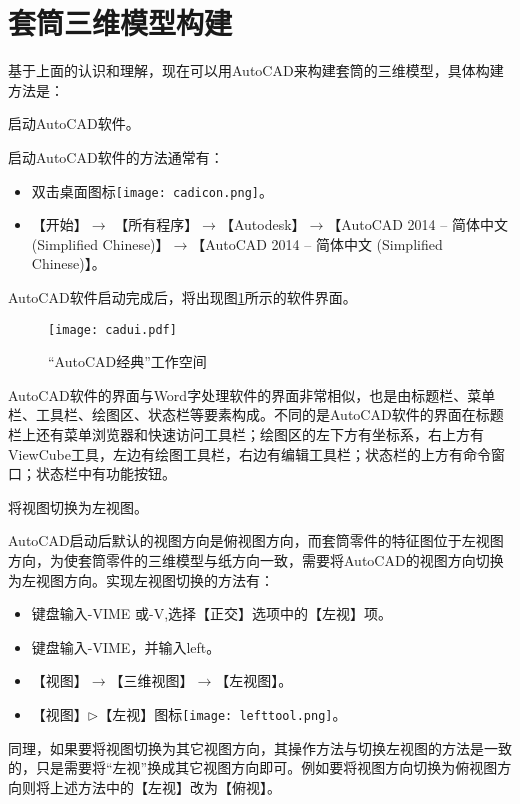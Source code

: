 \section{套筒三维模型构建}\label{sec:taotongjianmo}
基于上面的认识和理解，现在可以用AutoCAD来构建套筒的三维模型，具体构建方法是：
\begin{procedure}

\item 启动AutoCAD软件。

启动AutoCAD软件的方法通常有：
\begin{itemize}
\item 双击桌面图标\texttt{[image: cadicon.png]}。
\item 【开始】$\rightarrow$ 【所有程序】$\rightarrow$【Autodesk】$\rightarrow$【AutoCAD 2014 – 简体中文 (Simplified Chinese)】$\rightarrow$【AutoCAD 2014 – 简体中文 (Simplified Chinese)】。
\end{itemize}

AutoCAD软件启动完成后，将出现图\ref{fig:cadui}所示的软件界面。
\begin{figure}[htbp]
\centering
\texttt{[image: cadui.pdf]}
\caption{“AutoCAD经典”工作空间}\label{fig:cadui}
\end{figure}

AutoCAD软件的界面与Word字处理软件的界面非常相似，也是由标题栏、菜单栏、工具栏、绘图区、状态栏等要素构成。不同的是AutoCAD软件的界面在标题栏上还有菜单浏览器和快速访问工具栏；绘图区的左下方有坐标系，右上方有ViewCube工具，左边有绘图工具栏，右边有编辑工具栏；状态栏的上方有命令窗口；状态栏中有功能按钮。

\item 将视图切换为左视图。

AutoCAD启动后默认的视图方向是俯视图方向，而套筒零件的特征图位于左视图方向，为使套筒零件的三维模型与纸方向一致，需要将AutoCAD的视图方向切换为左视图方向。实现左视图切换的方法有：
\begin{itemize}
\item 键盘输入-VIME 或-V,选择【正交】选项中的【左视】项。
\item 键盘输入-VIME，并输入left。
\item 【视图】$\rightarrow$【三维视图】$\rightarrow$【左视图】。
\item 【视图】$\triangleright$【左视】图标\texttt{[image: lefttool.png]}。
\end{itemize}

同理，如果要将视图切换为其它视图方向，其操作方法与切换左视图的方法是一致的，只是需要将“左视”换成其它视图方向即可。例如要将视图方向切换为俯视图方向则将上述方法中的【左视】改为【俯视】。


\end{procedure}

